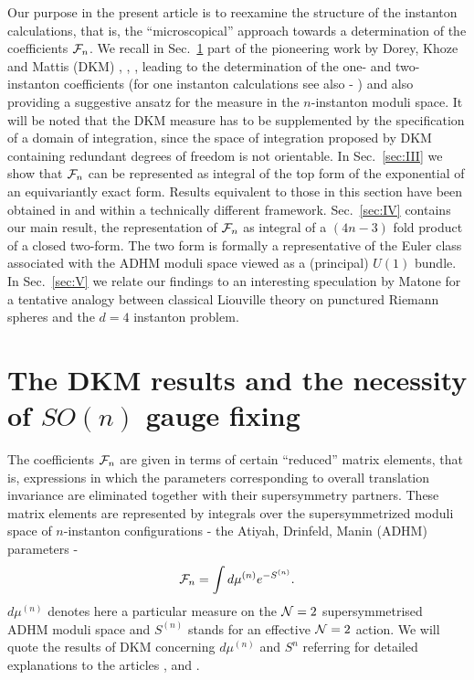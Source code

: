 \documentclass[a4paper,12pt]{article}
\begin{document}
Our purpose in the present article is to reexamine the structure of 
the instanton calculations, that is, the ``microscopical'' approach 
towards a determination of the coefficients ${\cal F}_n$. 
We recall in Sec.~\ref{sec:II} part of the pioneering work by Dorey, 
Khoze and Mattis (DKM) \cite{dorey1}, \cite{dorey2}, \cite{dorey3}, 
leading to the determination of the one- and two-instanton 
coefficients \cite{dorey1} (for one instanton calculations see 
also \cite{finnel} - \cite{yung}) and also providing a suggestive ansatz
for the measure in the $n$-instanton moduli space\cite{dorey3}. It 
will be noted that the DKM measure has to be supplemented by the 
specification of a domain of integration, since the space of 
integration proposed by DKM containing redundant degrees of 
freedom is not orientable. In Sec.~\ref{sec:III} we show that ${\cal F}_n$ 
can be represented as integral 
of the top form of the exponential of an 
equivariantly exact form. Results equivalent to those in 
this section have been obtained in \cite{tanzini1} and \cite{tanzini2} within 
a technically different framework. Sec.~\ref{sec:IV} contains our main 
result, the representation of ${\cal F}_n$ as integral of a 
$(4n-3)$ fold product of a closed two-form. The two form is formally 
a representative of the Euler class associated with the ADHM moduli 
space viewed as a (principal) $U(1)$ bundle. 
In Sec.~\ref{sec:V} we relate our findings to an interesting 
speculation by Matone \cite{matone1} for a tentative analogy 
between classical Liouville theory on punctured Riemann spheres 
and the $d=4$ instanton problem. 

\section{The DKM results and the necessity of $SO(n)$ gauge 
fixing}\label{sec:II}
 
The coefficients ${\cal F}_n$ are given in terms of certain ``reduced'' 
matrix elements, that is, expressions in which the parameters 
corresponding to overall translation invariance are eliminated 
together with their supersymmetry partners. These matrix 
elements are represented by integrals over the supersymmetrized 
moduli space of $n$-instanton configurations - the Atiyah, Drinfeld, 
Manin (ADHM) \cite{adhm} parameters - 
\begin{equation}
{\cal F}_n=\int d\mu^{(n)}e^{-S^{(n)}}.
\label{modspaceint}
\end{equation}
$d\mu^{(n)}$ denotes here a particular measure on the ${\cal N}=2$ 
supersymmetrised ADHM moduli space and $S^{(n)}$ stands for an 
effective ${\cal N}=2$ action. We will quote the results of 
DKM concerning $d\mu^{(n)}$ and $S^{n}$ referring for detailed 
explanations to the articles \cite{dorey1}, \cite{dorey2} and  
\cite{dorey3}. 
\end{document}
